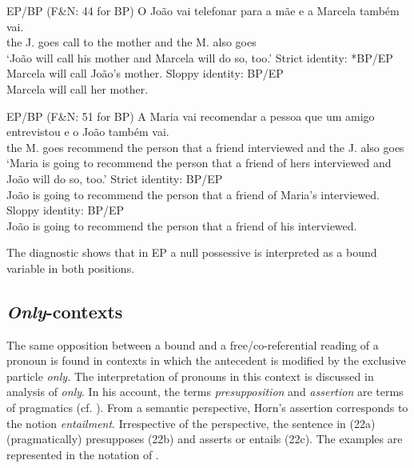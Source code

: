 \documentclass[output=paper]{langsci/langscibook}
\begin{document}
\ea%
         EP\slash BP (F\&N: 44 for BP)\label{ex:wein:20}
    \ea
    \gll O João vai telefonar para a mãe e a Marcela também vai.\\
         the J. goes call to the mother and the M. also goes  \\
    \glt ‘João will call his mother and Marcela will do so, too.’
    \ex Strict identity: *BP\slash *EP\\Marcela will call João’s mother.
    \ex Sloppy identity: BP\slash EP\\Marcela will call her mother.
    \z
\z

\ea%
         EP\slash BP (F\&N: 51 for BP)\label{ex:wein:21}
    \ea
    \gll A Maria vai recomendar a pessoa que um amigo entrevistou e o João também vai.\\
         the M. goes recommend the person that a friend interviewed and the J. also goes\\
    \glt ‘Maria is going to recommend the person that a friend of hers interviewed and João will do so, too.’
    \ex Strict identity: BP\slash *EP\\João is going to recommend the person that a friend of Maria’s interviewed.\\
    \ex Sloppy identity: BP\slash EP\\João is going to recommend the person that a friend of his interviewed. 
    \z
\z

The diagnostic shows that in EP a null possessive is interpreted as a bound variable in both positions.

\subsection{\textit{Only}-contexts}%

The same opposition between a bound and a free\slash co-referential reading of a pronoun is found in contexts in which the antecedent is modified by the exclusive particle \textit{only.} The interpretation of pronouns in this context is discussed in  analysis of \textit{only}. In his account, the terms \textit{presupposition} and \textit{assertion} are terms of pragmatics (cf. \citealt{Pagin2016}). From a semantic perspective, Horn’s assertion corresponds to the notion \textit{entailment}. Irrespective of the perspective, the sentence in (22a) (pragmatically) presupposes (22b) and asserts or entails (22c). The examples are represented in the notation of \citet{Horn1969}. 
\end{document}
